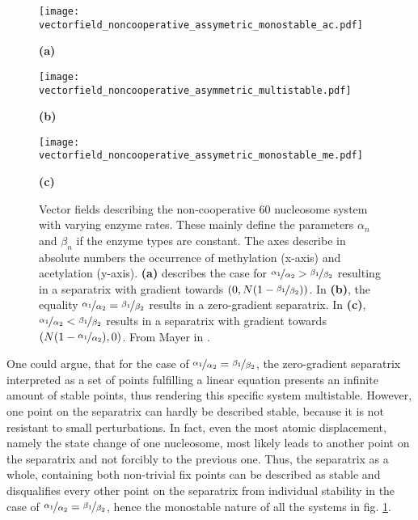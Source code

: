             \begin{figure}[!htbp]
                \centering
                \begin{minipage}{0.3\textwidth}
                    \texttt{[image: vectorfield\_noncooperative\_assymetric\_monostable\_ac.pdf]}
                    \caption*{\small \textbf{(a)}}
                \end{minipage}
                \begin{minipage}{0.3\textwidth}
                    \texttt{[image: vectorfield\_noncooperative\_asymmetric\_multistable.pdf]}
                    \caption*{\small \textbf{(b)}}
                \end{minipage}
                \begin{minipage}{0.3\textwidth}
                    \texttt{[image: vectorfield\_noncooperative\_assymetric\_monostable\_me.pdf]}
                    \caption*{\small \textbf{(c)}}
                \end{minipage}
               \caption{Vector fields describing the non-cooperative 60 nucleosome system with varying enzyme rates. These mainly define the parameters $\alpha_n$ and $\beta_n$ if the enzyme types are constant. The axes describe in absolute numbers the occurrence of methylation (x-axis) and acetylation (y-axis). \textbf{(a)} describes the case for $\nicefrac{\alpha_1}{\alpha_2} > \nicefrac{\beta_1}{\beta_2}$ resulting in a separatrix with gradient towards $(0,N(1-\nicefrac{\beta_1}{\beta_2}))$. In \textbf{(b)}, the equality $\nicefrac{\alpha_1}{\alpha_2} = \nicefrac{\beta_1}{\beta_2}$ results in a zero-gradient separatrix. In \textbf{(c)}, $\nicefrac{\alpha_1}{\alpha_2} < \nicefrac{\beta_1}{\beta_2}$ results in a separatrix with gradient towards $(N(1-\nicefrac{\alpha_1}{\alpha_2}),0)$. From Mayer in \cite{mayer2020langevin}.}
               \label{img:nonCooperativeVectorFields}
            \end{figure}

            One could argue, that for the case of $\nicefrac{\alpha_1}{\alpha_2} = \nicefrac{\beta_1}{\beta_2}$, the zero-gradient separatrix interpreted as a set of points fulfilling a linear equation presents an infinite amount of stable points, thus rendering this specific system multistable. However, one point on the separatrix can hardly be described stable, because it is not resistant to small perturbations. In fact, even the most atomic displacement, namely the state change of one nucleosome, most likely leads to another point on the separatrix and not forcibly to the previous one. Thus, the separatrix as a whole, containing both non-trivial fix points can be described as stable and disqualifies every other point on the separatrix from individual stability in the case of $\nicefrac{\alpha_1}{\alpha_2} = \nicefrac{\beta_1}{\beta_2}$, hence the monostable nature of all the systems in fig. \ref{img:nonCooperativeVectorFields}.


